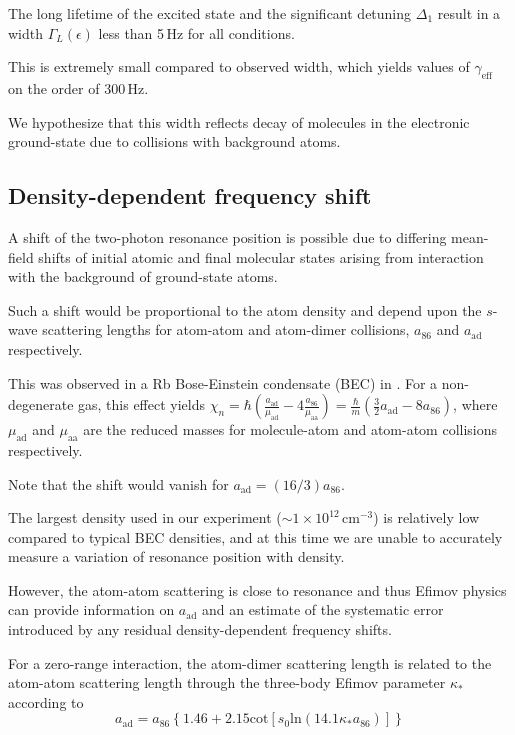 The long lifetime of the excited state and the significant detuning $\Delta_1$ result in a width $\Gamma_L(\epsilon)$ less than 5\,Hz for all conditions.

This is extremely small compared to observed width, which yields values of $\gamma_{\text{eff}}$ on the order of 300\,Hz.

We hypothesize that this width reflects decay of molecules in the electronic ground-state due to collisions with background atoms.







\subsection{Density-dependent frequency shift}
A shift of the two-photon resonance position is possible due to differing mean-field shifts of initial atomic and final molecular states arising from interaction with the background of ground-state atoms.

Such a shift would be proportional to the atom density and depend upon the $s$-wave scattering lengths for atom-atom and atom-dimer collisions, $a_{86}$ and $a_{\text{ad}}$ respectively.

This was observed in a Rb Bose-Einstein condensate (BEC) in \cite{wfh00}. For a non-degenerate gas, this effect yields $\chi_n=\hbar (\frac{a_{\text{ad}}}{\mu_{\text{ad}}}-4\frac{a_{86}}{\mu_{\text{aa}}})=\frac{\hbar}{m} (\frac{3 }{2}a_{\text{ad}}-8 a_{86})$, where $\mu_{\text{ad}}$ and $\mu_{\text{aa}}$ are the reduced masses for molecule-atom and atom-atom collisions respectively.

Note that the shift would vanish for $a_{\text{ad}}=(16/3) a_{86}$.

The largest density used in our experiment ($\sim 1\times 10^{12}\,\mathrm{cm}^{-3}$) is relatively low compared to typical BEC densities, and at this time we are unable to accurately measure a variation of resonance position with density.

However, the atom-atom scattering is close to resonance and thus Efimov physics can provide information on $a_{\text{ad}}$ \cite{bha07,nen17} and an estimate of the systematic error introduced by any residual density-dependent frequency shifts.

For a zero-range interaction, the atom-dimer scattering length is related to the atom-atom scattering length through the three-body Efimov parameter $\kappa_*$ according to \cite{bha07}
\begin{equation}\label{Eq:EfimovMoleculAtomScatteringLength}
  a_{\text{ad}}=a_{86}\left\{1.46 + 2.15 \mathrm{cot}[s_0 \mathrm{ln} (14.1\kappa_* a_{86}) ]\right\}
\end{equation}


